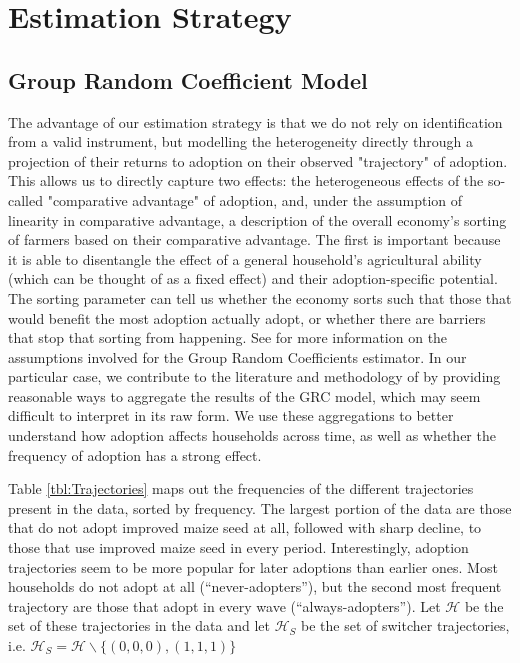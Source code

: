 \documentclass{article}
\begin{document}
\section{Estimation Strategy}

\subsection{Group Random Coefficient Model}

The advantage of our estimation strategy is that we do not rely on identification from a valid instrument, but modelling the heterogeneity directly through a projection of their returns to adoption on their observed "trajectory" of adoption. This allows us to directly capture two effects: the heterogeneous effects of the so-called "comparative advantage" of adoption, and, under the assumption of linearity in comparative advantage, a description of the overall economy's sorting of farmers based on their comparative advantage. The first is important because it is able to disentangle the effect of a general household's agricultural ability (which can be thought of as a fixed effect) and their adoption-specific potential. The sorting parameter can tell us whether the economy sorts such that those that would benefit the most adoption actually adopt, or whether there are barriers that stop that sorting from happening. See \cite{Tjernstrom_Emilia_Dalia_Ghanem_Oscar_Barriga_Cabanillas_Travis_J_Lybbert_Jeffrey_D_Michler_and_Aleksandr_Michuda2020-bc} for more information on the assumptions involved for the Group Random Coefficients estimator. In our particular case, we contribute to the literature and methodology of \cite{Tjernstrom_Emilia_Dalia_Ghanem_Oscar_Barriga_Cabanillas_Travis_J_Lybbert_Jeffrey_D_Michler_and_Aleksandr_Michuda2020-bc} by providing reasonable ways to aggregate the results of the GRC model, which may seem difficult to interpret in its raw form. We use these aggregations to better understand how adoption affects households across time, as well as whether the frequency of adoption has a strong effect.



Table \ref{tbl:Trajectories} maps out the frequencies of the different trajectories present in the data, sorted by frequency. The largest portion of the data are those that do not adopt improved maize seed at all, followed with sharp decline, to those that use improved maize seed in every period. Interestingly, adoption trajectories seem to be more popular for later adoptions than earlier ones. Most households do not adopt at all (``never-adopters''), but the second most frequent trajectory are those that adopt in every wave (``always-adopters''). Let $\mathcal{H}$ be the set of these trajectories in the data and let $\mathcal{H}_S$ be the set of switcher trajectories, i.e. $\mathcal{H}_S = \mathcal{H}\backslash\{(0,0,0), (1,1,1)\}$
\end{document}
